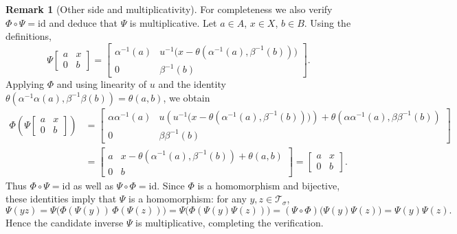 \documentclass{article}
\theoremstyle{plain}
\theoremstyle{definition}
\newtheorem{remark}[theorem]{Remark}
\newcommand{\T}{\mathcal{T}}
\begin{document}
\begin{remark}[Other side and multiplicativity]
For completeness we also verify $\Phi\circ\Psi=\mathrm{id}$ and deduce that $\Psi$ is multiplicative.
Let $a\in A$, $x\in X$, $b\in B$. Using the definitions,
\[
\Psi\!\begin{bmatrix}a&x\\[2pt]0&b\end{bmatrix}
=
\begin{bmatrix}
\alpha^{-1}(a) & u^{-1}\!\bigl(x-\theta(\alpha^{-1}(a),\beta^{-1}(b))\bigr)\\[2pt]
0 & \beta^{-1}(b)
\end{bmatrix}.
\]
Applying $\Phi$ and using linearity of $u$ and the identity $\theta(\alpha^{-1}\alpha(a),\beta^{-1}\beta(b))=\theta(a,b)$, we obtain
\begin{align*}
\Phi\!\left(\Psi\!\begin{bmatrix}a&x\\0&b\end{bmatrix}\right)
&=
\begin{bmatrix}
\alpha\alpha^{-1}(a) &
u\!\left(u^{-1}\!\bigl(x-\theta(\alpha^{-1}(a),\beta^{-1}(b))\bigr)\right)+
\theta\!\left(\alpha\alpha^{-1}(a),\beta\beta^{-1}(b)\right)
\\[2pt]
0 & \beta\beta^{-1}(b)
\end{bmatrix}\\
&=
\begin{bmatrix}
a & x-\theta(\alpha^{-1}(a),\beta^{-1}(b))+\theta(a,b)\\[2pt]
0 & b
\end{bmatrix}
=
\begin{bmatrix}a&x\\[2pt]0&b\end{bmatrix}.
\end{align*}
Thus $\Phi\circ\Psi=\mathrm{id}$ as well as $\Psi\circ\Phi=\mathrm{id}$.
Since $\Phi$ is a homomorphism and bijective, these identities imply that $\Psi$ is a homomorphism:
for any $y,z\in \T_\sigma$,
\[
\Psi(yz)=\Psi\bigl(\Phi(\Psi(y))\,\Phi(\Psi(z))\bigr)
=\Psi\bigl(\Phi(\Psi(y)\Psi(z))\bigr)
=(\Psi\circ\Phi)\bigl(\Psi(y)\Psi(z)\bigr)=\Psi(y)\Psi(z).
\]
Hence the candidate inverse $\Psi$ is multiplicative, completing the verification.
\end{remark}
\end{document}
